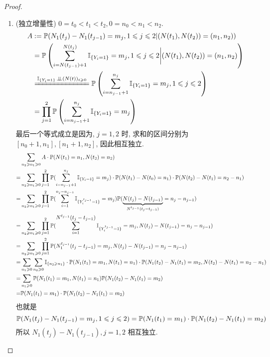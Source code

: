 \begin{proof}
\begin{enumerate}
    \item (独立增量性) $0=t_0<t_1<t_2,0=n_0<n_1<n_2$.
        \[
        \begin{aligned}
            A&:=\PP(N_1(t_j)-N_1(t_{j-1})=m_j,1\leq j\leq 2|(N(t_1),N(t_2))=(n_1,n_2))\\
            &=\PP\left(\sum_{i=N(t_{j-1})+1}^{N(t_j)}\II_{\{Y_i=1\}}=m_j,1\leq j\leq 2\bigg|(N(t_1),N(t_2))=(n_1,n_2)\right)\\
            &\xlongequal{\II_{\{Y_i=1\}}\ind (N(t))_{t\geq 0}}\PP\left(\sum_{i=n_{j-1}+1}^{n_j}\II_{\{Y_i=1\}}=m_j,1\leq j\leq 2\right)\\
            &=\prod_{j=1}^2 \PP\left(\sum_{i=n_{j-1}+1}^{n_j}\II_{\{Y_i=1\}}=m_j\right)
        \end{aligned}
        \]
        	最后一个等式成立是因为, $j=1,2$ 时, 求和的区间分别为 $[n_0+1,n_1],[n_1+1,n_2]$, 因此相互独立.
        \[
        \begin{aligned}
            &\sum_{n_2\geqslant n_1\geqslant 0}A\cdot \mathbb{P}(N(t_1)=n_1,N(t_2)=n_2)\\
            =&\sum_{n_2\geqslant n_1\geqslant 0}\prod_{j=1}^2\mathbb{P}(\sum_{i=n_{j-1}+1}^{n_j}\mathbb I_{\{Y_i=1\}}=m_j)\cdot \mathbb{P}(N(t_1)-N(t_0)=n_1)\cdot \mathbb{P}(N(t_2)-N(t_1)=n_2-n_1)\\
            =&\sum_{n_2\geqslant n_1\geqslant 0}\prod_{j=1}^2\mathbb{P}(\sum_{i=1}^{n_j-n_{j-1}}\mathbb I_{\{Y_i^{t_{j-1}}=1\}}=m_j)\mathbb{P}(\underbrace{\displaystyle N(t_j)-N(t_{j-1})}_{N^{t_{j-1}}(t_j-t_{j-1})}=n_j-n_{j-1})\\
            =&\sum_{n_2\geqslant n_1\geqslant 0}\prod_{j=1}^2 \mathbb{P}(\sum_{i=1}^{\displaystyle  N^{t_{j-1}}(t_j-t_{j-1})}\mathbb I_{\{Y_i^{t_{j-1}}=1\}}=m_j, N(t_j)-N(t_{j-1})=n_j-n_{j-1})\\
            =&\sum_{n_2\geqslant n_1\geqslant 0}\prod_{j=1}^2 \mathbb{P}(N_1^{t_{j-1}}(t_j-t_{j-1})=m_j, N(t_j)-N(t_{j-1})=n_j-n_{j-1})\\
            =&\sum_{n_1\geqslant 0}\sum_{n_2\geqslant 0}\mathbb I_{\{n_2\geqslant n_1\}}\cdot \mathbb{P}(N_1(t_1)=m_1,N(t_1)=n_1)\cdot \mathbb{P}(N_1(t_2)-N_1(t_1)=m_2,N(t_2)-N(t_1)=n_2-n_1)\\
            =&\sum_{n_1\geqslant 0}\mathbb{P}(N_1(t_1)=m_1,N(t_1)=n_1)\mathbb{P}(N_1(t_2)-N_1(t_1)=m_2)\\
            =&\mathbb{P}(N_1(t_1)=m_1)\cdot \mathbb{P}(N_1(t_2)-N_1(t_1)=m_2)
        \end{aligned}
        \]
        也就是
        \[
        \mathbb{P}(N_1(t_j)-N_1(t_{j-1})=m_j,1\leqslant j\leqslant 2)=\mathbb{P}(N_1(t_1)=m_1)\cdot \mathbb{P}(N_1(t_2)-N_1(t_1)=m_2)
        \]
        所以 $N_1(t_j)-N_1(t_{j-1}),j=1,2$ 相互独立.
\end{enumerate}
\end{proof}

